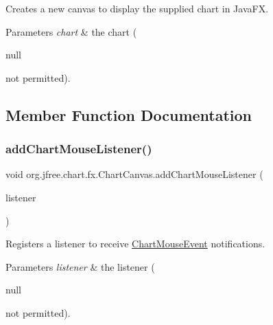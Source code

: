 Creates a new canvas to display the supplied chart in Java\+FX.


\begin{DoxyParams}{Parameters}
{\em chart} & the chart (
\begin{DoxyCode}
null 
\end{DoxyCode}
 not permitted). \\
\hline
\end{DoxyParams}


\subsection{Member Function Documentation}
\mbox{\label{classorg_1_1jfree_1_1chart_1_1fx_1_1_chart_canvas_a15e8f2e9327531eec5415480bc6ecc69}} 
\subsubsection{\texorpdfstring{add\+Chart\+Mouse\+Listener()}{addChartMouseListener()}}
{\footnotesize\ttfamily void org.\+jfree.\+chart.\+fx.\+Chart\+Canvas.\+add\+Chart\+Mouse\+Listener (\begin{DoxyParamCaption}\item[{\mbox{\hyperlink{interfaceorg_1_1jfree_1_1chart_1_1fx_1_1interaction_1_1_chart_mouse_listener_f_x}{Chart\+Mouse\+Listener\+FX}}}]{listener }\end{DoxyParamCaption})}

Registers a listener to receive \mbox{\hyperlink{classorg_1_1jfree_1_1chart_1_1_chart_mouse_event}{Chart\+Mouse\+Event}} notifications.


\begin{DoxyParams}{Parameters}
{\em listener} & the listener (
\begin{DoxyCode}
null 
\end{DoxyCode}
 not permitted). \\
\hline
\end{DoxyParams}
\mbox{\label{classorg_1_1jfree_1_1chart_1_1fx_1_1_chart_canvas_a697b7c41214361f43cdb72c046a8169f}} 
